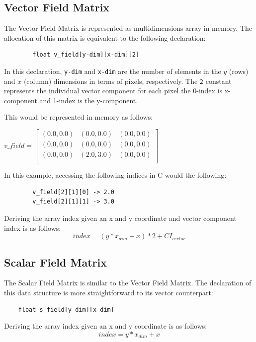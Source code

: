 \documentclass[
10pt, %
letterpaper, %
oneside, %
headinclude,footinclude, %
BCOR5mm, %
]{scrartcl}
\begin{document}
\subsection{Vector Field Matrix}
The Vector Field Matrix is represented as multidimensions array in memory. The allocation of this matrix is equivalent to the following declaration:
\begin{center}
    \begin{verbatim}
        float v_field[y-dim][x-dim][2]
    \end{verbatim}
\end{center}
In this declaration, \verb|y-dim| and \verb|x-dim| are the number of elements in the $y$ (rows) and $x$ (column) dimensions in terms of pixels, respectively.
The \verb|2| constant represents the individual vector component for each pixel the 0-index is x-component and 1-index is the y-component.

This would be represented in memory as follows:
\begin{center}
    $v\_field = \begin{bmatrix}
        (0.0,0.0) & (0.0,0.0) & (0.0, 0.0)\\
        (0.0,0.0) & (0.0,0.0) & (0.0, 0.0)\\
        (0.0,0.0) & (2.0,3.0) & (0.0, 0.0)\\
    \end{bmatrix}$
\end{center}

In this example, accessing the following indices in C would the following:
\begin{center}
    \begin{verbatim}
        v_field[2][1][0] -> 2.0
        v_field[2][1][1] -> 3.0
    \end{verbatim}
\end{center}

Deriving the array index given an x and y coordinate and vector component index is as follows:
\begin{equation}
    index = (y * x_{dim} + x) * 2 + CI_{vector}
\end{equation}

\subsection{Scalar Field Matrix}
The Scalar Field Matrix is similar to the Vector Field Matrix. The declaration of this data structure is more straightforward to its vector counterpart:
\begin{verbatim}
    float s_field[y-dim][x-dim]
\end{verbatim}
Deriving the array index given an x and y coordinate is as follows:
\begin{equation}
    index = y * x_{dim} + x
\end{equation}
    
\end{document}
